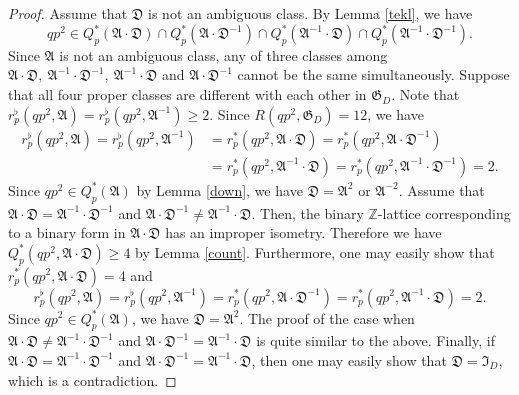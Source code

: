 \documentclass{amsart}
\theoremstyle{definition}
\theoremstyle{remark}
\numberwithin{equation}{section}
\begin{document}
\begin{proof}
 Assume that $\mathfrak D$ is not an ambiguous class. 
By Lemma \ref{tekl}, we have
$$
qp^2 \in Q_p^*(\mathfrak A\cdot\mathfrak D) \cap Q_p^*(\mathfrak A\cdot\mathfrak D^{-1}) \cap Q_p^*(\mathfrak A^{-1}\cdot\mathfrak D) \cap Q_p^*(\mathfrak A^{-1}\cdot\mathfrak D^{-1}).
$$
Since $\mathfrak A$ is not an ambiguous class, any of three classes among $\mathfrak A\cdot\mathfrak D, \  \mathfrak A^{-1}\cdot\mathfrak D^{-1},\   \mathfrak A^{-1}\cdot\mathfrak D$ and $\mathfrak A\cdot\mathfrak D^{-1}$ cannot be the same simultaneously.  Suppose that all four proper classes are different with each other  in $\mathfrak G_D$. 
 Note that $r_p^{\flat}(qp^2,\mathfrak A)=r_p^{\flat}(qp^2,\mathfrak A^{-1}) \ge 2$. Since $R(qp^2,\mathfrak G_D)=12$, we have
$$
\begin{array} {rl}
r_p^{\flat}(qp^2,\mathfrak A) =r_p^{\flat}(qp^2,\mathfrak A^{-1})\!\!\!&=r_p^*(qp^2,\mathfrak A\cdot\mathfrak D)=r_p^*(qp^2,\mathfrak A\cdot\mathfrak D^{-1})\\
&=r_p^*(qp^2,\mathfrak A^{-1}\cdot\mathfrak D)=r_p^*(qp^2,\mathfrak A^{-1}\cdot\mathfrak D^{-1})=2.
\end{array}
$$
Since $qp^2 \in Q_p^*(\mathfrak A)$ by Lemma \ref{down}, we have $\mathfrak D=\mathfrak A^2$ or $\mathfrak A^{-2}$.  Assume that $\mathfrak A\cdot\mathfrak D=\mathfrak A^{-1}\cdot\mathfrak D^{-1}$ and  $\mathfrak A\cdot\mathfrak D^{-1} \ne \mathfrak A^{-1}\cdot\mathfrak D$.  Then, the binary ${{\mathbb Z}}$-lattice corresponding to a binary form in $\mathfrak A\cdot\mathfrak D$  has an improper isometry. Therefore we have $Q_p^*(qp^2,\mathfrak A\cdot\mathfrak D) \ge 4$ by Lemma \ref{count}.  Furthermore, one may easily show that  $r_p^*(qp^2,\mathfrak A\cdot\mathfrak D)=4$ and 
$$
r_p^{\flat}(qp^2,\mathfrak A) =r_p^{\flat}(qp^2,\mathfrak A^{-1})=r_p^*(qp^2,\mathfrak A\cdot\mathfrak D^{-1})=r_p^*(qp^2,\mathfrak A^{-1}\cdot\mathfrak D)=2.
$$
Since $qp^2 \in Q_p^*(\mathfrak A)$, we have $\mathfrak D=\mathfrak A^2$. The proof of the case when  $\mathfrak A\cdot\mathfrak D \ne \mathfrak A^{-1}\cdot\mathfrak D^{-1}$ and  $\mathfrak A\cdot\mathfrak D^{-1} = \mathfrak A^{-1}\cdot\mathfrak D$ is quite similar to the above.   Finally, if $\mathfrak A\cdot\mathfrak D=\mathfrak A^{-1}\cdot\mathfrak D^{-1}$ and  $\mathfrak A\cdot\mathfrak D^{-1}=\mathfrak A^{-1}\cdot\mathfrak D$, then one may easily show that $\mathfrak D=\mathfrak I_D$, which is a contradiction.  


\end{proof}
\end{document}
